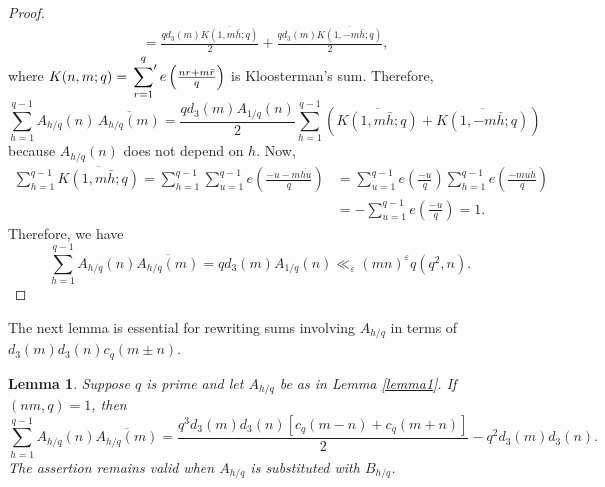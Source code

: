 \documentclass[oneside,reqno,10pt]{amsart}
\numberwithin{equation}{section}
\theoremstyle{plain}
\newtheorem{lemma}{Lemma}
\theoremstyle{definition}
\numberwithin{equation}{section}
\begin{document}
\begin{proof}
\begin{align*}
        &=\frac{qd_3(m)\overline{K(1,m\bar h;q)}}{2}+\frac{qd_3(m)\overline{K(1,-m\bar h;q)}}{2},
\end{align*} 
where $K(n,m;q)=\sideset{}{'}\sum\limits_{r=1}^qe\left(\frac{nr+m\bar r}{q}\right)$ is Kloosterman’s sum. Therefore, 
\begin{equation*}
        \sum_{h=1}^{q-1}A_{h/q}(n)\,\overline{A_{h/q}(m)}=\frac{qd_3(m)A_{1/q}(n)}{2}\sum_{h=1}^{q-1}\left(\overline{K(1,m\bar h;q)}+\overline{K(1,-m\bar h;q)}\right)
\end{equation*} 
because $A_{h/q}(n)$ does not depend on $h$. Now,
\begin{align*}
    \sum_{h=1}^{q-1}\overline{K(1,m\bar h;q)}=\sum_{h=1}^{q-1}\sum_{u=1}^{q-1}e\left(\frac{-u-m\overline{hu}}{q}\right)&=\sum_{u=1}^{q-1}e\left(\frac{-u}{q}\right)\sum_{h=1}^{q-1}e\left(\frac{-m\overline{uh}}{q}\right)\\
    &=-\sum_{u=1}^{q-1}e\left(\frac{-u}{q}\right)=1.
\end{align*}
Therefore, we have
\begin{equation*}
        \sum_{h=1}^{q-1}A_{h/q}(n)\overline{A_{h/q}(m)}=qd_3(m)A_{1/q}(n)\ll_{\varepsilon} (mn)^{\varepsilon}q(q^2,n).
\end{equation*}
\end{proof}
The next lemma is essential for rewriting sums involving $A_{h/q}$ in terms of $d_3(m)d_3(n)c_q(m\pm n)$.
\begin{lemma}\label{lemma3}
    Suppose $q$ is prime and let $A_{h/q}$ be as in Lemma \ref{lemma1}. If $(nm,q)=1$, then $$\sum\limits_{h=1}^{q-1}A_{h/q}(n)\overline{A_{h/q}(m)}=\frac{q^3d_3(m)d_3(n)\left[c_q(m-n)+c_q(m+n)\right]}{2}-q^2d_3(m)d_3(n).$$
    The assertion remains valid when $A_{h/q}$ is substituted with $B_{h/q}$.
\end{lemma}
\end{document}
